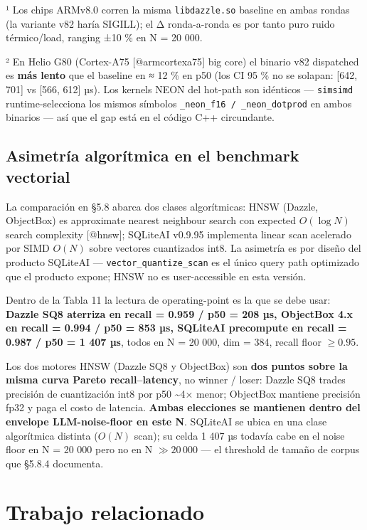 ¹ Los chips ARMv8.0 corren la misma \texttt{libdazzle.so} baseline en ambas
rondas (la variante v82 haría SIGILL); el Δ ronda-a-ronda es por tanto puro
ruido térmico/load, ranging ±10 \% en N = 20 000.

² En Helio G80 (Cortex-A75 {[}@armcortexa75{]} big core) el binario v82
dispatched es \textbf{más lento} que el baseline en ≈ 12 \% en p50 (los CI 95 \%
no se solapan: {[}642, 701{]} vs {[}566, 612{]} µs). Los kernels NEON del
hot-path son idénticos --- \texttt{simsimd} runtime-selecciona los mismos
símbolos \texttt{\_neon\_f16\ /\ \_neon\_dotprod} en ambos binarios --- así que
el gap está en el código C++ circundante.

\subsection{Asimetría algorítmica en el benchmark
vectorial}\label{asimetruxeda-algoruxedtmica-en-el-benchmark-vectorial}

La comparación en §5.8 abarca dos clases algorítmicas: HNSW (Dazzle, ObjectBox)
es approximate nearest neighbour search con expected \(O(\log N)\) search
complexity {[}@hnsw{]}; SQLiteAI v0.9.95 implementa linear scan acelerado por
SIMD \(O(N)\) sobre vectores cuantizados int8. La asimetría es por diseño del
producto SQLiteAI --- \texttt{vector\_quantize\_scan} es el único query path
optimizado que el producto expone; HNSW no es user-accessible en esta versión.

Dentro de la Tabla 11 la lectura de operating-point es la que se debe usar:
\textbf{Dazzle SQ8 aterriza en recall = 0.959 / p50 = 208 µs, ObjectBox 4.x en
recall = 0.994 / p50 = 853 µs, SQLiteAI precompute en recall = 0.987 / p50 = 1
407 µs}, todos en N = 20 000, dim = 384, recall floor \(\geq 0.95\).

Los dos motores HNSW (Dazzle SQ8 y ObjectBox) son \textbf{dos puntos sobre la
misma curva Pareto recall--latency}, no winner / loser: Dazzle SQ8 trades
precisión de cuantización int8 por p50 \textasciitilde4× menor; ObjectBox
mantiene precisión fp32 y paga el costo de latencia. \textbf{Ambas elecciones se
mantienen dentro del envelope LLM-noise-floor en este N}. SQLiteAI se ubica en
una clase algorítmica distinta (\(O(N)\) scan); su celda 1 407 µs todavía cabe
en el noise floor en N = 20 000 pero no en N \(\gg 20\,000\) --- el threshold de
tamaño de corpus que §5.8.4 documenta.

\section{Trabajo relacionado}\label{trabajo-relacionado}

